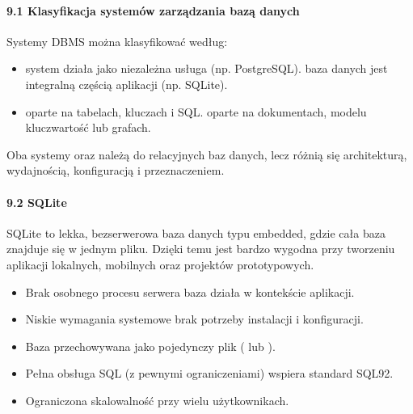 \documentclass[letterpaper,10pt,polish]{sphinxmanual}
\begin{document}
\paragraph{9.1 Klasyfikacja systemów zarządzania bazą danych}
\label{\detokenize{rozdzial2/Konfiguracja_baz_danych/Konfiguracja_baz_danych:klasyfikacja-systemow-zarzadzania-baza-danych}}
\sphinxAtStartPar
Systemy DBMS można klasyfikować według:
\begin{itemize}
\item {} 
\sphinxAtStartPar
{}
\sphinxhyphen{}  \textendash{} system działa jako niezależna usługa (np. PostgreSQL).
\sphinxhyphen{}  \textendash{} baza danych jest integralną częścią aplikacji (np. SQLite).

\item {} 
\sphinxAtStartPar
{}
\sphinxhyphen{}  \textendash{} oparte na tabelach, kluczach i SQL.
\sphinxhyphen{}  \textendash{} oparte na dokumentach, modelu klucz\sphinxhyphen{}wartość lub grafach.

\end{itemize}

\sphinxAtStartPar
Oba systemy \textendash{}  oraz  \textendash{} należą do relacyjnych baz danych, lecz różnią się architekturą, wydajnością, konfiguracją i przeznaczeniem.


\paragraph{9.2 SQLite}
\label{\detokenize{rozdzial2/Konfiguracja_baz_danych/Konfiguracja_baz_danych:sqlite}}
\sphinxAtStartPar
SQLite to lekka, bezserwerowa baza danych typu embedded, gdzie cała baza znajduje się w jednym pliku. Dzięki temu jest bardzo wygodna przy tworzeniu aplikacji lokalnych, mobilnych oraz projektów prototypowych.

\sphinxAtStartPar
{}
\begin{itemize}
\item {} 
\sphinxAtStartPar
Brak osobnego procesu serwera \textendash{} baza działa w kontekście aplikacji.

\item {} 
\sphinxAtStartPar
Niskie wymagania systemowe \textendash{} brak potrzeby instalacji i konfiguracji.

\item {} 
\sphinxAtStartPar
Baza przechowywana jako pojedynczy plik ( lub ).

\item {} 
\sphinxAtStartPar
Pełna obsługa SQL (z pewnymi ograniczeniami) \textendash{} wspiera standard SQL\sphinxhyphen{}92.

\item {} 
\sphinxAtStartPar
Ograniczona skalowalność przy wielu użytkownikach.

\end{itemize}
\end{document}
